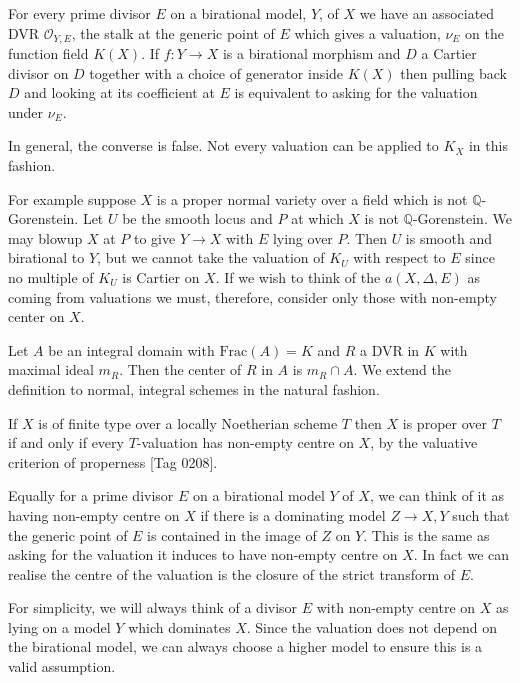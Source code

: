 \documentclass[a4paper,12pt]{book}
\begin{document}
For every prime divisor $E$ on a birational model, $Y$, of $X$ we have an associated DVR $\mathcal{O}_{Y,E}$, the stalk at the generic point of $E$ which gives a valuation, $\nu_{E}$ on the function field $K(X)$. If $f:Y \to X$ is a birational morphism and $D$ a Cartier divisor on $D$ together with a choice of generator inside $K(X)$ then pulling back $D$ and looking at its coefficient at $E$ is equivalent to asking for the valuation under $\nu_{E}$. 

In general, the converse is false. Not every valuation can be applied to $K_{X}$ in this fashion.

For example suppose $X$ is a proper normal variety over a field which is not $\mathbb{Q}$-Gorenstein. Let $U$ be the smooth locus and $P$ at which $X$ is not $\mathbb{Q}$-Gorenstein. We may blowup $X$ at $P$ to give $Y \to X$ with $E$ lying over $P$. Then $U$ is smooth and birational to $Y$, but we cannot take the valuation of $K_{U}$ with respect to $E$ since no multiple of $K_{U}$ is Cartier on $X$. If we wish to think of the $a(X,\Delta,E)$ as coming from valuations we must, therefore, consider only those with non-empty center on $X$. 

\begin{definition}
	Let $A$ be an integral domain with $\text{Frac}(A)=K$ and $R$ a DVR in $K$ with maximal ideal $m_{R}$. Then the center of $R$ in $A$ is $m_{R}\cap A$. We extend the definition to normal, integral schemes in the natural fashion.
\end{definition}

If $X$ is of finite type over a locally Noetherian scheme $T$ then $X$ is proper over $T$ if and only if every $T$-valuation has non-empty centre on $X$, by the valuative criterion of properness \cite{stacks-project}[Tag 0208]. 

Equally for a prime divisor $E$ on a birational model $Y$ of $X$, we can think of it as having non-empty centre on $X$ if there is a dominating model $Z \to X,Y$ such that the generic point of $E$ is contained in the image of $Z$ on $Y$. This is the same as asking for the valuation it induces to have non-empty centre on $X$. In fact we can realise the centre of the valuation is the closure of the strict transform of $E$.

For simplicity, we will always think of a divisor $E$ with non-empty centre on $X$ as lying on a model $Y$ which dominates $X$. Since the valuation does not depend on the birational model, we can always choose a higher model to ensure this is a valid assumption. 
\end{document}
